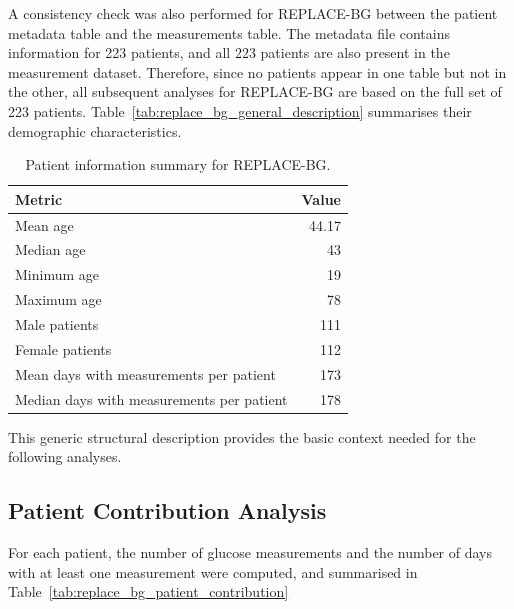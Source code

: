 A consistency check was also performed for REPLACE-BG between the patient metadata table and the measurements table. The metadata file contains information for 223 patients, and all 223 patients are also present in the measurement dataset. Therefore, since no patients appear in one table but not in the other, all subsequent analyses for REPLACE-BG are based on the full set of 223 patients. Table~\ref{tab:replace_bg_general_description} summarises their demographic characteristics.

\begin{table}[htbp]
    \centering
    \caption{Patient information summary for REPLACE-BG.}
    \label{tab:replace_bg_patient_summary}
    \begin{tabular}{lr}
        \hline
        \textbf{Metric} & \textbf{Value} \\
        \hline
        Mean age & 44.17 \\
        Median age & 43 \\
        Minimum age & 19 \\
        Maximum age & 78 \\
        \hline
        Male patients & 111 \\
        Female patients & 112 \\
        \hline
        Mean days with measurements per patient & 173 \\
        Median days with measurements per patient & 178 \\
        \hline
    \end{tabular}
\end{table}

This generic structural description provides the basic context needed for the following analyses.

\subsection{Patient Contribution Analysis}
\label{subsec:replacebg_patient_contribution}

For each patient, the number of glucose measurements and the number of days with at least one measurement were computed, and summarised in Table~\ref{tab:replace_bg_patient_contribution}

